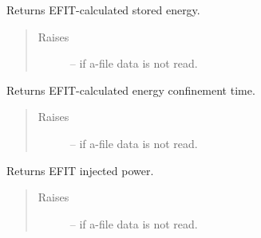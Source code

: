 \documentclass[letterpaper,10pt,english]{sphinxmanual}
\begin{document}
\begin{fulllineitems}
\begin{fulllineitems}
\begin{quote}
\begin{description}
\end{description}\end{quote}

\end{fulllineitems}


\begin{fulllineitems}
\label{eqtools:eqtools.eqdskreader.EqdskReader.getWMHD}
Returns EFIT-calculated stored energy.
\begin{quote}\begin{description}
\item[{Raises}] \leavevmode
{} -- if a-file data is not read.

\end{description}\end{quote}

\end{fulllineitems}


\begin{fulllineitems}
\label{eqtools:eqtools.eqdskreader.EqdskReader.getTauMHD}
Returns EFIT-calculated energy confinement time.
\begin{quote}\begin{description}
\item[{Raises}] \leavevmode
{} -- if a-file data is not read.

\end{description}\end{quote}

\end{fulllineitems}


\begin{fulllineitems}
\label{eqtools:eqtools.eqdskreader.EqdskReader.getPinj}
Returns EFIT injected power.
\begin{quote}\begin{description}
\item[{Raises}] \leavevmode
{} -- if a-file data is not read.

\end{description}\end{quote}


\end{fulllineitems}
\end{fulllineitems}
\end{document}
